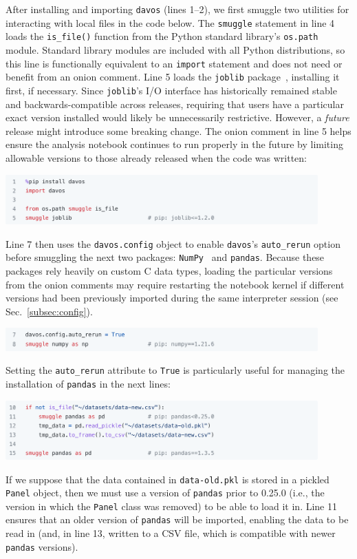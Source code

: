 \documentclass[preprint,12pt,a4paper]{elsarticle}
\begin{document}
After installing and importing \texttt{davos} (lines 1--2), we first smuggle two
utilities for interacting with local files in the code below. The
\texttt{smuggle} statement in line 4 loads the \texttt{is\_file()}
function from the Python standard library's \texttt{os.path}
module. Standard library modules are included with all Python
distributions, so this line is functionally equivalent to an
\texttt{import} statement and does not need or benefit from an onion
comment. Line 5 loads the \texttt{joblib} package~\cite{Varo10},
installing it first, if necessary. Since \texttt{joblib}'s I/O
interface has historically remained stable and backwards-compatible
across releases, requiring that users have a particular exact version
installed would likely be unnecessarily restrictive. However, a
\textit{future} release might introduce some breaking change.  The
onion comment in line 5 helps ensure the analysis notebook continues
to run properly in the future by limiting allowable versions to those
already released when the code was written:
\begin{center}
\includegraphics[width=0.9\textwidth]{figs/example1}
\end{center}
Line 7 then uses the \texttt{davos.config} object to enable
\texttt{davos}'s \texttt{auto\_rerun} option before smuggling the next
two packages: \texttt{NumPy}~\cite{HarrEtal20} and
\texttt{pandas}. Because these packages rely heavily on custom C data
types, loading the particular versions from the onion comments may
require restarting the notebook kernel if different versions had been previously
imported during the same interpreter session (see
Sec.~\ref{subsec:config}).
\begin{center}
\includegraphics[width=0.9\textwidth]{figs/example2}
\end{center}
Setting the \texttt{auto\_rerun} attribute to \texttt{True} is particularly useful
for managing the installation of \texttt{pandas} in the next
lines:
\begin{center}
\includegraphics[width=0.9\textwidth]{figs/example3}
\end{center}
If we suppose that the data contained in \texttt{data-old.pkl} is
stored in a pickled \texttt{Panel} object, then we must use a version of
\texttt{pandas} prior to 0.25.0 (i.e., the version in which the \texttt{Panel}
class was removed) to be able to load it in. Line 11 ensures
that an older version of \texttt{pandas} will be imported, enabling
the data to be read in (and, in line 13, written to a CSV
file, which is compatible with newer \texttt{pandas} versions).
\end{document}
